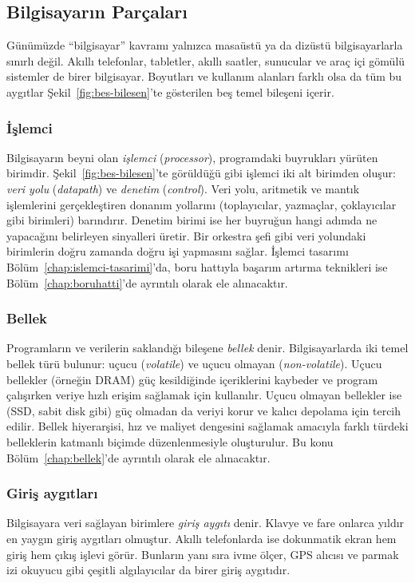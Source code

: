 \subsection{Bilgisayarın Parçaları}
\label{sec:bilgisayar-parcalari}

Günümüzde ``bilgisayar'' kavramı yalnızca masaüstü ya da dizüstü bilgisayarlarla sınırlı değil. Akıllı telefonlar, tabletler, akıllı saatler, sunucular ve araç içi gömülü sistemler de birer bilgisayar. Boyutları ve kullanım alanları farklı olsa da tüm bu aygıtlar Şekil~\ref{fig:bes-bilesen}'te gösterilen beş temel bileşeni içerir.

\subsubsection*{İşlemci}
Bilgisayarın beyni olan \emph{işlemci} (\emph{processor}), programdaki buyrukları yürüten birimdir. Şekil~\ref{fig:bes-bilesen}'te görüldüğü gibi işlemci iki alt birimden oluşur: \emph{veri yolu} (\emph{datapath}) ve \emph{denetim} (\emph{control}). Veri yolu, aritmetik ve mantık işlemlerini gerçekleştiren donanım yollarını (toplayıcılar, yazmaçlar, çoklayıcılar gibi birimleri) barındırır. Denetim birimi ise her buyruğun hangi adımda ne yapacağını belirleyen sinyalleri üretir. Bir orkestra şefi gibi veri yolundaki birimlerin doğru zamanda doğru işi yapmasını sağlar. İşlemci tasarımı Bölüm~\ref{chap:islemci-tasarimi}'da, boru hattıyla başarım artırma teknikleri ise Bölüm~\ref{chap:boruhatti}'de ayrıntılı olarak ele alınacaktır.

\subsubsection*{Bellek}
Programların ve verilerin saklandığı bileşene \emph{bellek} denir. Bilgisayarlarda iki temel bellek türü bulunur: uçucu (\emph{volatile}) ve uçucu olmayan (\emph{non-volatile}). Uçucu bellekler (örneğin DRAM) güç kesildiğinde içeriklerini kaybeder ve program çalışırken veriye hızlı erişim sağlamak için kullanılır. Uçucu olmayan bellekler ise (SSD, sabit disk gibi) güç olmadan da veriyi korur ve kalıcı depolama için tercih edilir. Bellek hiyerarşisi, hız ve maliyet dengesini sağlamak amacıyla farklı türdeki belleklerin katmanlı biçimde düzenlenmesiyle oluşturulur. Bu konu Bölüm~\ref{chap:bellek}'de ayrıntılı olarak ele alınacaktır.

\subsubsection*{Giriş aygıtları}
Bilgisayara veri sağlayan birimlere \emph{giriş aygıtı} denir. Klavye ve fare onlarca yıldır en yaygın giriş aygıtları olmuştur. Akıllı telefonlarda ise dokunmatik ekran hem giriş hem çıkış işlevi görür. Bunların yanı sıra ivme ölçer, GPS alıcısı ve parmak izi okuyucu gibi çeşitli algılayıcılar da birer giriş aygıtıdır.

